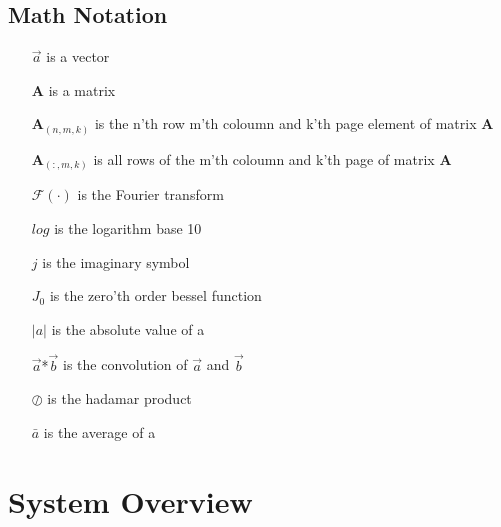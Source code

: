 \chapter*{Math Notation}
\begin{itemize}
\item[{$\overrightarrow{a}$}] is a vector
\item[{$\textbf{A}$}] is a matrix
\item[{$\textbf{A}_{(n,m,k)}$}] is the n'th row m'th coloumn and k'th page element of matrix \textbf{A}
\item[{$\textbf{A}_{(:,m,k)}$}] is all rows of the m'th coloumn and k'th page of matrix \textbf{A}
\item[{$\mathcal{F}(\cdot)$}] is the Fourier transform
\item[{$log$}] is the logarithm base 10
\item[{$j$}] is the imaginary symbol
\item[{$J_0$}] is the zero'th order bessel function
\item[{$|a|$}] is the absolute value of a
\item[{$\overrightarrow{a}$*$\overrightarrow{b}$}] is the convolution of $\overrightarrow{a}$ and $\overrightarrow{b}$
\item[{$\oslash$}] is the hadamar product
\item[{$\bar{a}$}] is the average of a
\end{itemize}

\cleardoublepage


\cleardoublepage
	

\fancyhead[RE,LO]{}
\fancyhead[RO,LE]{\small\nouppercase\leftmark} %





\pagestyle{fancy}
\makeatletter



\part{System Overview}



